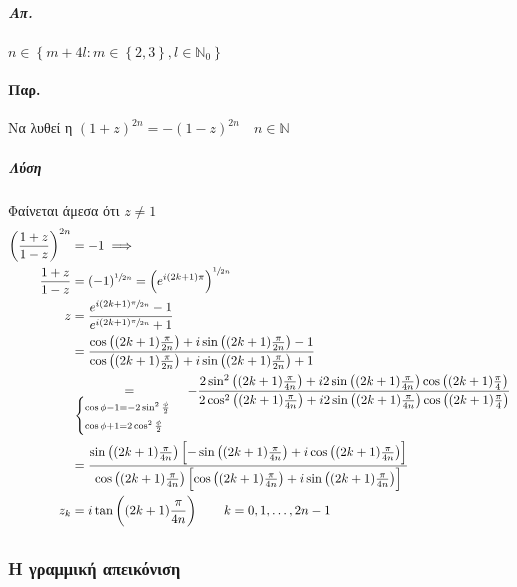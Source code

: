 \documentclass[12pt,a4paper,titlepage,fleqn]{article}
\begin{document}
    \subparagraph{Απ.} \( 
    n\in\left\lbrace m+4l: m\in\left\lbrace 2,3 \right\rbrace
    ,l\in \mathbb N_0
    \right\rbrace
     \)
     
    \paragraph{Παρ.}
    Να λυθεί η \( (1+z)^{2n}=-(1-z)^{2n}\quad n\in\mathbb N \)
    \subparagraph{Λύση}
    Φαίνεται άμεσα ότι \( z\neq 1 \)
    \begin{align*}
    \left(
    \frac{1+z}{1-z}
    \right)^{2n}&=-1 \implies \\
    \frac{1+z}{1-z} &= (-1)^{\sfrac{1}{2n}}
    = \left(e^{i(2k+1)\pi}\right)^{\sfrac{1}{2n}}
    \\ z&=\frac{
    	e^{i(2k+1)\sfrac{\pi}{2n}}-1
    	}{e^{i(2k+1)\sfrac{\pi}{2n}}+1}
    \\ &= \frac{
    	\cos\left((2k+1)\frac{\pi}{2n}\right)+i\sin\left((2k+1)\frac{\pi}{2n}\right)-1
    	}{
    	\cos\left((2k+1)\frac{\pi}{2n}\right)+i\sin\left((2k+1)\frac{\pi}{2n}\right)+1
    	}
    \\ & \underset{\textstyle \begin{cases}
    	\mathsmaller{\cos\phi-1=-2\sin^2\frac{\phi}{2}}\\
    	\mathsmaller{\cos\phi+1=2\cos^2\frac{\phi}{2}}
    	\end{cases}}{=} -\frac{
    	2\sin^2\left( (2k+1)\frac{\pi}{4n} \right)+i2\sin\left((2k+1)\frac{\pi}{4n}\right)\cos\left(
    	(2k+1)\frac{\pi}{4}
    	\right)
    	}{2\cos^2\left( (2k+1)\frac{\pi}{4n} \right)+i2\sin\left((2k+1)\frac{\pi}{4n}\right)\cos\left(
    	(2k+1)\frac{\pi}{4}
    	\right)}
    \\ &= \frac{
    	\sin\left((2k+1)\frac{\pi}{4n}\right)\left[
    	-\sin\left(
    	(2k+1)\frac{\pi}{4n}
    	\right)+i\cos\left(
    	(2k+1)\frac{\pi}{4n}
    	\right)
    	\right]
    	}{\cos\left(
    	(2k+1)\frac{\pi}{4n}
    	\right)\left[
    	\cos\left((2k+1)\frac{\pi}{4n}\right)+i\sin\left(
    	(2k+1)\frac{\pi}{4n}
    	\right)
    	\right]}
    \\ z_k &= i\tan\left((2k+1)\frac{\pi}{4n}\right) \qquad
    k=0,1,\dots,2n-1
    \end{align*}
    
    \subsection{}
    \subsubsection{Η γραμμική απεικόνιση}
\end{document}
